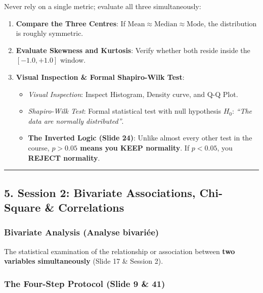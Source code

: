 \documentclass[
]{article}
\providecommand{\tightlist}{%
  \setlength{\itemsep}{0pt}\setlength{\parskip}{0pt}}
\begin{document}
Never rely on a single metric; evaluate all three simultaneously:

\begin{enumerate}
\def\labelenumi{\arabic{enumi}.}
\tightlist
\item
  \textbf{Compare the Three Centres}: If
  \(\text{Mean} \approx \text{Median} \approx \text{Mode}\), the
  distribution is roughly symmetric.
\item
  \textbf{Evaluate Skewness and Kurtosis}: Verify whether both reside
  inside the \([-1.0, +1.0]\) window.
\item
  \textbf{Visual Inspection \& Formal Shapiro-Wilk Test}:

  \begin{itemize}
  \tightlist
  \item
    \emph{Visual Inspection}: Inspect Histogram, Density curve, and Q-Q
    Plot.
  \item
    \emph{Shapiro-Wilk Test}: Formal statistical test with null
    hypothesis \(H_0\): \emph{``The data are normally distributed''}.
  \item
    \textbf{The Inverted Logic (Slide 24)}: Unlike almost every other
    test in the course, \textbf{\(p > 0.05\) means you KEEP normality}.
    If \(p < 0.05\), you \textbf{REJECT normality}.
  \end{itemize}
\end{enumerate}

\begin{center}\rule{0.5\linewidth}{0.5pt}\end{center}

\subsection{5. Session 2: Bivariate Associations, Chi-Square \&
Correlations}\label{session-2-bivariate-associations-chi-square-correlations}

\subsubsection{Bivariate Analysis (Analyse
bivariée)}\label{bivariate-analysis-analyse-bivariuxe9e}

The statistical examination of the relationship or association between
\textbf{two variables simultaneously} (Slide 17 \& Session 2).

\subsubsection{The Four-Step Protocol (Slide 9 \&
41)}\label{the-four-step-protocol-slide-9-41}
\end{document}
